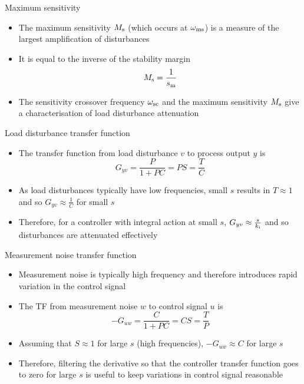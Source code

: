 \documentclass[10pt]{beamer-control}
\begin{document}
\begin{frame}{Maximum sensitivity}
  \begin{itemize}
    \item The maximum sensitivity $M_{\text{s}}$ (which occurs at $\omega_{\text{ms}}$) is a measure of the largest amplification of disturbances
    \item It is equal to the inverse of the stability margin
      \begin{equation}
        M_{\text{s}} =\frac{1}{s_{\text{m}}}
      \end{equation}
    \item The sensitivity crossover frequency $\omega_{\text{sc}}$ and the maximum sensitivity $M_{\text{s}}$ give a characterisation of load disturbance attenuation
  \end{itemize}
\end{frame}

\begin{frame}{Load disturbance transfer function}
  \begin{itemize}
    \item The transfer function from load disturbance $v$ to process output $y$ is
      \begin{equation}
        G_{yv} = \frac{P}{1+PC}=PS=\frac{T}{C}
      \end{equation}
    \item As load disturbances typically have low frequencies, small $s$ results in $T\approx1$ and so $G_{yv}\approx \frac{1}{C}$ for small $s$
    \item Therefore, for a controller with integral action at small $s$, $G_{yv}\approx \frac{s}{k_{\mathrm{i}}}$ and so disturbances are attenuated effectively

  \end{itemize}
\end{frame}

\begin{frame}{Measurement noise transfer function}
  \begin{itemize}
    \item Measurement noise is typically high frequency and therefore introduces rapid variation in the control signal
    \item The TF from measurement noise $w$ to control signal $u$ is
      \begin{equation}
        -G_{uw} = \frac{C}{1+PC}=CS=\frac{T}{P}
      \end{equation}
    \item Assuming that $S\approx 1$ for large $s$ (high frequencies), $-G_{uw}\approx C$ for large $s$
    \item Therefore, filtering the derivative so that the controller transfer function goes to zero for large $s$ is useful to keep variations in control signal reasonable

  \end{itemize}
\end{frame}


\SUMMARYFRAME
\FINALE
\end{document}
